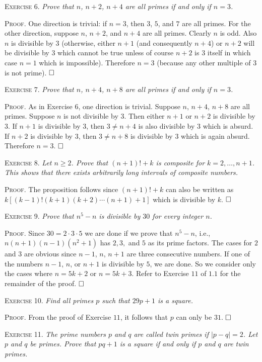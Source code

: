 \documentclass[11pt, leqno]{article}
\newcommand{\done}{\ensuremath{\hfill\square}}
\begin{document}
\textsc{Exercise 6}. \emph{Prove that $n$, $n+2$, $n+4$ are all primes if and only if $n=3$.}

\textsc{Proof}. One direction is trivial: if $n=3$, then $3$, $5$, and $7$ are all primes. For the other direction, suppose $n$, $n+2$, and $n+4$ are all primes. Clearly $n$ is odd. Also $n$ is divisible by $3$ (otherwise, either $n+1$ (and consequently $n+4$) or $n+2$ will be divisible by $3$ which cannot be true unless of course $n+2$ is $3$ itself in which case $n=1$ which is impossible). Therefore $n=3$ (because any other multiple of 3 is not prime). \done

\textsc{Exercise 7}. \emph{Prove that $n$, $n+4$, $n+8$ are all primes if and only if $n=3$.}

\textsc{Proof}. As in Exercise 6, one direction is trivial. Suppose $n$, $n+4$, $n+8$ are all primes. Suppose $n$ is not divisible by $3$. Then either $n+1$ or $n+2$ is divisible by $3$. If $n+1$ is divisible by $3$, then $3 \ne n+4$ is also divisible by $3$ which is absurd. If $n+2$ is divisible by $3$, then $3 \ne n+8$ is divisible by $3$ which is again absurd. Therefore $n=3$. \done

\textsc{Exercise 8}. \emph{Let $n \geq 2$. Prove that $(n+1)! + k$ is composite for $k= 2, \ldots, n+1$. This shows that there exists arbitrarily long intervals of composite numbers.}

\textsc{Proof}. The proposition follows since $(n+1)!+k$ can also be written as $k[(k-1)!(k+1)(k+2)\cdots (n+1) + 1]$ which is divisible by $k$. \done

\textsc{Exercise 9}. \emph{Prove that $n^5-n$ is divisible by $30$ for every integer $n$.}

\textsc{Proof}. Since $30 = 2\cdot 3\cdot 5$ we are done if we prove that $n^5-n$, i.e., $n(n+1)(n-1)(n^2+1)$ has $2, 3,$ and $5$ as its prime factors. The cases for $2$ and $3$ are obvious since $n-1$, $n$, $n+1$ are three consecutive numbers. If one of the numbers $n-1$, $n$, or $n+1$ is divisible by $5$, we are done. So we consider only the cases where $n=5k+2$ or $n=5k+3$. Refer to Exercise $11$ of $1.1$ for the remainder of the proof. \done

\textsc{Exercise 10}. \emph{Find all primes $p$ such that $29p+1$ is a square.}

\textsc{Proof}. From the proof of Exercise $11$, it follows that $p$ can only be $31$. \done

\textsc{Exercise 11}. \emph{The prime numbers $p$ and $q$ are called twin primes if $|p-q|=2$. Let $p$ and $q$ be primes. Prove that $pq+1$ is a square if and only if $p$ and $q$ are twin primes.}
\end{document}
